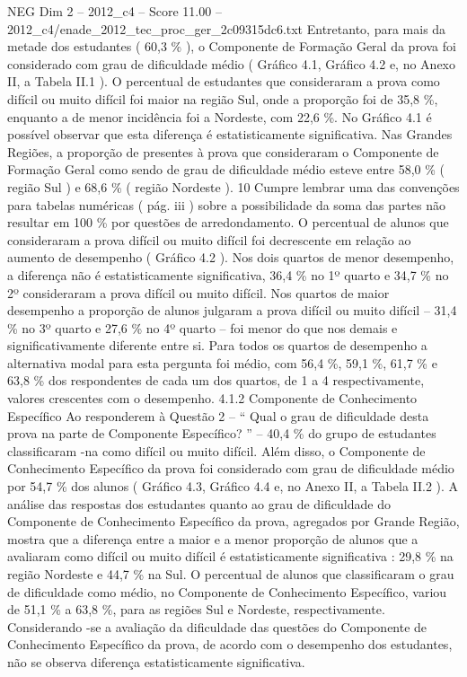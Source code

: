 \begin{textsample}{NEG Dim 2 – 2012\_c4 – Score 11.00 – 2012\_c4/enade\_2012\_tec\_proc\_ger\_2c09315dc6.txt}
Entretanto, para mais da metade dos estudantes ( 60,3 \% ), o Componente de Formação Geral da prova foi considerado com grau de dificuldade médio ( Gráfico 4.1, Gráfico 4.2 e, no Anexo II, a Tabela II.1 ).
O percentual de estudantes que consideraram a prova como difícil ou muito difícil foi maior na região Sul, onde a proporção foi de 35,8 \%, enquanto a de menor incidência foi a Nordeste, com 22,6 \%.
No Gráfico 4.1 é possível observar que esta diferença é estatisticamente significativa.
Nas Grandes Regiões, a proporção de presentes à prova que consideraram o Componente de Formação Geral como sendo de grau de dificuldade médio esteve entre 58,0 \% ( região Sul ) e 68,6 \% ( região Nordeste ). 10 Cumpre lembrar uma das convenções para tabelas numéricas ( pág. iii ) sobre a possibilidade da soma das partes não resultar em 100 \% por questões de arredondamento.
O percentual de alunos que consideraram a prova difícil ou muito difícil foi decrescente em relação ao aumento de desempenho ( Gráfico 4.2 ).
Nos dois quartos de menor desempenho, a diferença não é estatisticamente significativa, 36,4 \% no 1º quarto e 34,7 \% no 2º consideraram a prova difícil ou muito difícil.
Nos quartos de maior desempenho a proporção de alunos julgaram a prova difícil ou muito difícil – 31,4 \% no 3º quarto e 27,6 \% no 4º quarto – foi menor do que nos demais e significativamente diferente entre si.
Para todos os quartos de desempenho a alternativa modal para esta pergunta foi médio, com 56,4 \%, 59,1 \%, 61,7 \% e 63,8 \% dos respondentes de cada um dos quartos, de 1 a 4 respectivamente, valores crescentes com o desempenho. 4.1.2 Componente de Conhecimento Específico Ao responderem à Questão 2 – “ Qual o grau de dificuldade desta prova na parte de Componente Específico? ” – 40,4 \% do grupo de estudantes classificaram -na como difícil ou muito difícil.
Além disso, o Componente de Conhecimento Específico da prova foi considerado com grau de dificuldade médio por 54,7 \% dos alunos ( Gráfico 4.3, Gráfico 4.4 e, no Anexo II, a Tabela II.2 ).
A análise das respostas dos estudantes quanto ao grau de dificuldade do Componente de Conhecimento Específico da prova, agregados por Grande Região, mostra que a diferença entre a maior e a menor proporção de alunos que a avaliaram como difícil ou muito difícil é estatisticamente significativa : 29,8 \% na região Nordeste e 44,7 \% na Sul.
O percentual de alunos que classificaram o grau de dificuldade como médio, no Componente de Conhecimento Específico, variou de 51,1 \% a 63,8 \%, para as regiões Sul e Nordeste, respectivamente.
Considerando -se a avaliação da dificuldade das questões do Componente de Conhecimento Específico da prova, de acordo com o desempenho dos estudantes, não se observa diferença estatisticamente significativa.

\end{textsample}
